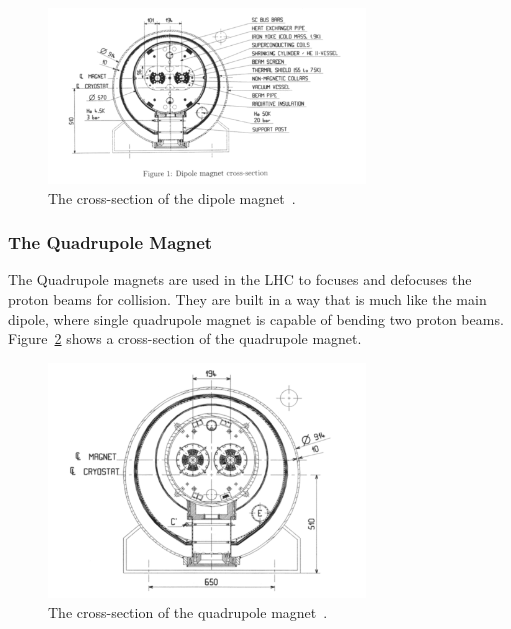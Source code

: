 \begin{figure}[!htb]
    \begin{center}
        \includegraphics[width=0.75\textwidth]{figures/chapter_ATLAS/DipoleMagnets}
        \caption{
        The cross-section of the dipole magnet~\cite{Bruning:782076}.
        }
        \label{fig:dipole}
    \end{center}
\end{figure}

\subsubsection*{The Quadrupole Magnet}
The Quadrupole magnets are used in the LHC to focuses and defocuses the proton beams for collision. They are built in a way that is much like the main dipole, where single quadrupole magnet is capable of bending two proton beams. Figure~\ref{fig:quadrupole} shows a cross-section of the quadrupole magnet. 

\begin{figure}[!htb]
    \begin{center}
        \includegraphics[width=0.75\textwidth]{figures/chapter_ATLAS/QuadrupoleMagnets}
        \caption{
            The cross-section of the quadrupole magnet~\cite{Bruning:782076}.
        }
        \label{fig:quadrupole}
    \end{center}
\end{figure}

